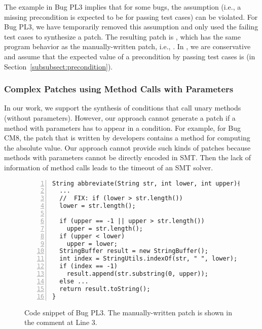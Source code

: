 The example in Bug PL3 implies that for some bugs, the assumption (i.e., a missing precondition is expected to be  for passing test cases) can be violated. For Bug PL3, we have temporarily removed this assumption and only used the failing test cases to synthesize a patch. The resulting patch is , which has the same program behavior as the manually-written patch, i.e., . In \nopol, we are conservative and assume that the expected value of a precondition by passing test cases is  (in Section~\ref{subsubsect:precondition}). 

\subsubsection{Complex Patches using Method Calls with Parameters}

In our work, we support the synthesis of conditions that call unary methods (without parameters). However, our approach cannot generate a patch if a method with parameters has to appear in a condition. For example, for Bug CM8, the patch that is written by developers contains a method  for computing the absolute value. Our approach cannot provide such kinds of patches because methods with parameters cannot be directly encoded in SMT. Then the lack of information of method calls leads to the timeout of an SMT solver.

\begin{figure}[!t]
\centering
\noindent\begin{minipage}{0.4\textwidth}
\begin{lstlisting}[numbers=left]
String abbreviate(String str, int lower, int upper){
  ...
  //  FIX: if (lower > str.length()) 
  lower = str.length();    

  if (upper == -1 || upper > str.length()) 
    upper = str.length();
  if (upper < lower) 
    upper = lower;
  StringBuffer result = new StringBuffer();
  int index = StringUtils.indexOf(str, " ", lower);
  if (index == -1) 
    result.append(str.substring(0, upper));    
  else ...
  return result.toString();
}
\end{lstlisting}

\end{minipage}
\caption{Code snippet of Bug PL3. The manually-written patch is shown in the  comment at Line 3.}
\label{fig:bug-pl3}
\end{figure}

